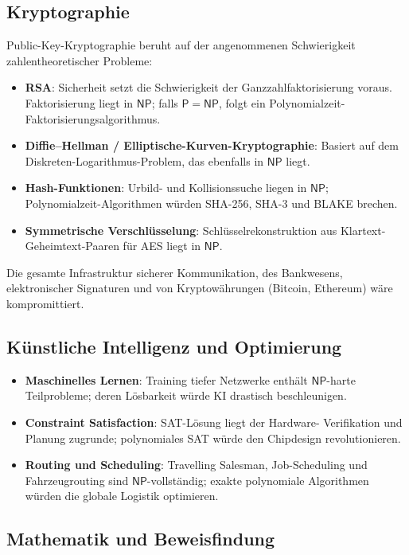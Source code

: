 \documentclass[12pt,a4paper]{amsart}
\theoremstyle{definition}
\newcommand{\Pclass}{\mathsf{P}}
\newcommand{\NP}{\mathsf{NP}}
\begin{document}
\subsection{Kryptographie}

Public-Key-Kryptographie beruht auf der angenommenen Schwierigkeit
zahlentheoretischer Probleme:
\begin{itemize}
  \item \textbf{RSA}: Sicherheit setzt die Schwierigkeit der
    Ganzzahlfaktorisierung voraus.  Faktorisierung liegt in $\NP$;
    falls $\Pclass=\NP$, folgt ein Polynomialzeit-Faktorisierungsalgorithmus.
  \item \textbf{Diffie--Hellman / Elliptische-Kurven-Kryptographie}: Basiert
    auf dem Diskreten-Logarithmus-Problem, das ebenfalls in $\NP$ liegt.
  \item \textbf{Hash-Funktionen}: Urbild- und Kollisionssuche liegen in $\NP$;
    Polynomialzeit-Algorithmen würden SHA-256, SHA-3 und BLAKE brechen.
  \item \textbf{Symmetrische Verschlüsselung}: Schlüsselrekonstruktion aus
    Klartext-Geheimtext-Paaren für AES liegt in $\NP$.
\end{itemize}

Die gesamte Infrastruktur sicherer Kommunikation, des Bankwesens, elektronischer
Signaturen und von Kryptowährungen (Bitcoin, Ethereum) wäre kompromittiert.

\subsection{Künstliche Intelligenz und Optimierung}

\begin{itemize}
  \item \textbf{Maschinelles Lernen}: Training tiefer Netzwerke enthält
    $\NP$-harte Teilprobleme; deren Lösbarkeit würde KI drastisch
    beschleunigen.
  \item \textbf{Constraint Satisfaction}: SAT-Lösung liegt der Hardware-
    Verifikation und Planung zugrunde; polynomiales SAT würde den Chipdesign
    revolutionieren.
  \item \textbf{Routing und Scheduling}: Travelling Salesman, Job-Scheduling
    und Fahrzeugrouting sind $\NP$-vollständig; exakte polynomiale Algorithmen
    würden die globale Logistik optimieren.
\end{itemize}

\subsection{Mathematik und Beweisfindung}
\end{document}
